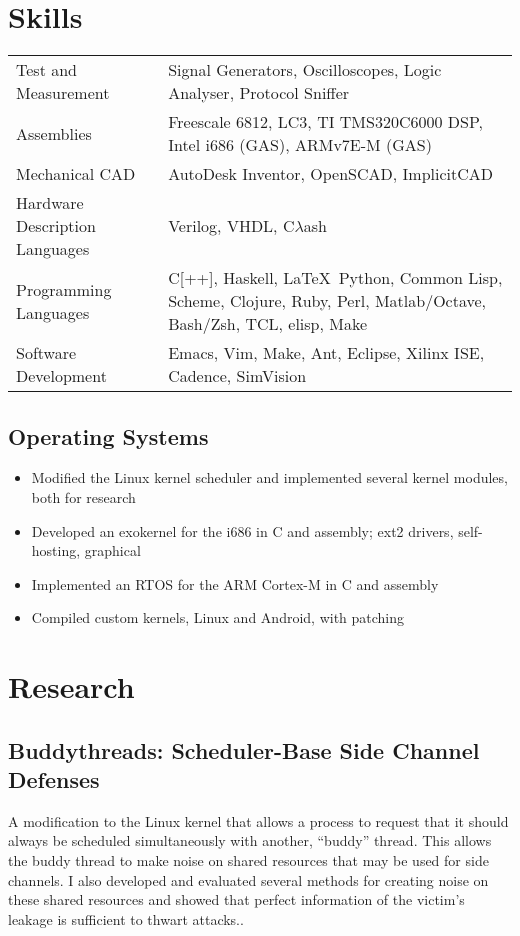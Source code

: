 \documentclass[letterpaper,12pt]{resume}
\begin{document}
\section{Skills}
\noindent
\begin{tabular}{p{}p{}}
  Test and Measurement&
  Signal Generators, Oscilloscopes, Logic Analyser, Protocol Sniffer\\
  \noalign{\smallskip}
  Assemblies&
  Freescale 6812, LC3, TI TMS320C6000 DSP, Intel i686 (GAS), ARMv7E-M (GAS)\\
  \noalign{\smallskip}
  Mechanical CAD&
  AutoDesk Inventor, OpenSCAD, ImplicitCAD\\
  \noalign{\smallskip}
  Hardware Description Languages&
  Verilog, VHDL, C$\lambda$ash\\
  \noalign{\smallskip}
  Programming Languages&
  C[++], Haskell, \LaTeX\, Python, Common Lisp, Scheme, Clojure, Ruby, Perl, Matlab/Octave, Bash/Zsh, TCL, elisp, Make \\
  \noalign{\smallskip}
  Software Development&
  Emacs, Vim, Make, Ant, Eclipse, Xilinx ISE, Cadence, SimVision\\
\end{tabular}

\subsection{Operating Systems}
\begin{itemize}
  \item
    Modified the Linux kernel scheduler and implemented several kernel modules,
    both for research
  \item
    Developed an exokernel for the i686 in C and assembly; ext2 drivers, self-hosting, graphical
  \item
    Implemented an RTOS for the ARM Cortex-M in C and assembly
  \item
    Compiled custom kernels, Linux and Android, with patching
\end{itemize}

\pagebreak
\section{Research}
\subsection{Buddythreads: Scheduler-Base Side Channel Defenses}
A modification to the Linux kernel that allows a process to request that it
should always be scheduled simultaneously with another, ``buddy'' thread.
This allows the buddy thread to make noise on shared resources that may be used
for side channels.
I also developed and evaluated several methods for creating noise on these
shared resources and showed that perfect information of the victim's leakage is
sufficient to thwart attacks..
\end{document}

